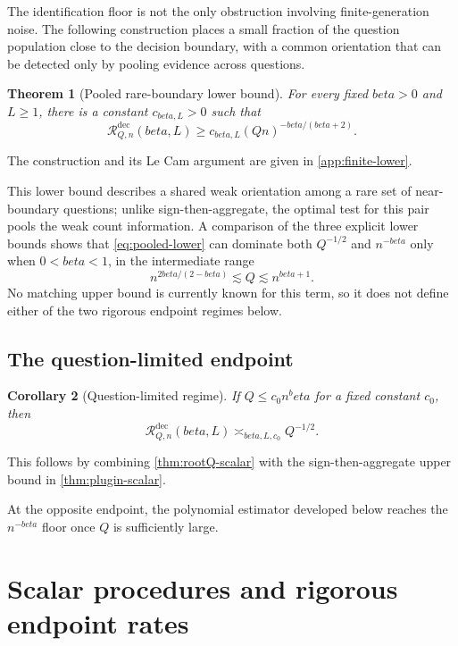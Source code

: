 \documentclass[11pt]{article}
\def\beta{beta}%
\newtheorem{theorem}{Theorem}[section]
\newtheorem{corollary}[theorem]{Corollary}
\newcommand{\calR}{\mathcal R}
\begin{document}
The identification floor is not the only obstruction involving finite-generation noise.  The following construction places a small fraction of the question population close to the decision boundary, with a common orientation that can be detected only by pooling evidence across questions.

\begin{theorem}[Pooled rare-boundary lower bound]
\label{thm:pooled-lower}
For every fixed $\beta>0$ and $L\ge1$, there is a constant $c_{\beta,L}>0$ such that
\begin{equation}
\label{eq:pooled-lower}
\calR^{\mathrm{dec}}_{Q,n}(\beta,L)
\ge
c_{\beta,L}(Qn)^{-\beta/(\beta+2)}.
\end{equation}
\end{theorem}
The construction and its Le Cam argument are given in \cref{app:finite-lower}.

This lower bound describes a shared weak orientation among a rare set of near-boundary questions; unlike sign-then-aggregate, the optimal test for this pair pools the weak count information.  A comparison of the three explicit lower bounds shows that \eqref{eq:pooled-lower} can dominate both $Q^{-1/2}$ and $n^{-\beta}$ only when $0<\beta<1$, in the intermediate range
\[
n^{2\beta/(2-\beta)}
\lesssim Q
\lesssim n^{\beta+1}.
\]
No matching upper bound is currently known for this term, so it does not define either of the two rigorous endpoint regimes below.

\subsection{The question-limited endpoint}

\begin{corollary}[Question-limited regime]
\label{cor:question-limited}
If $Q\le c_0 n^\beta$ for a fixed constant $c_0$, then
\begin{equation}
\label{eq:question-limited}
\calR^{\mathrm{dec}}_{Q,n}(\beta,L)
\asymp_{\beta,L,c_0}
Q^{-1/2}.
\end{equation}
\end{corollary}
This follows by combining \cref{thm:rootQ-scalar} with the sign-then-aggregate upper bound in \cref{thm:plugin-scalar}.

At the opposite endpoint, the polynomial estimator developed below reaches the $n^{-\beta}$ floor once $Q$ is sufficiently large.

\section{Scalar procedures and rigorous endpoint rates}
\label{sec:scalar-estimators}
\end{document}
